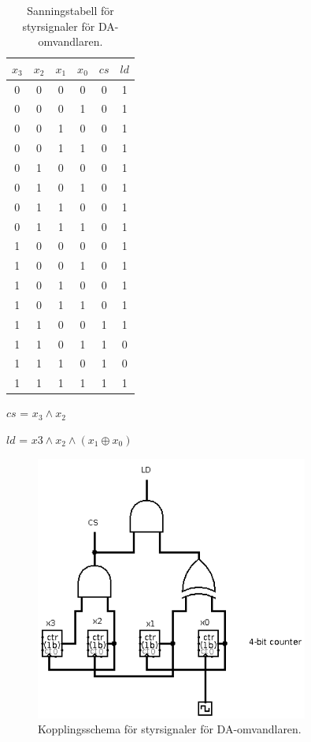 \documentclass[a4paper,10pt]{article}
\begin{document}
\begin{table}
\centering
\begin{tabular}{|c c c c || c c |}
\hline
$x_3$ & $x_2$ & $x_1$ & $x_0$ & $cs$ & $ld$ \\\hline
0 & 0 & 0 & 0 & 0 & 1 \\
0 & 0 & 0 & 1 & 0 & 1 \\
0 & 0 & 1 & 0 & 0 & 1 \\
0 & 0 & 1 & 1 & 0 & 1 \\
0 & 1 & 0 & 0 & 0 & 1 \\
0 & 1 & 0 & 1 & 0 & 1 \\
0 & 1 & 1 & 0 & 0 & 1 \\
0 & 1 & 1 & 1 & 0 & 1 \\
1 & 0 & 0 & 0 & 0 & 1 \\
1 & 0 & 0 & 1 & 0 & 1 \\
1 & 0 & 1 & 0 & 0 & 1 \\
1 & 0 & 1 & 1 & 0 & 1 \\
1 & 1 & 0 & 0 & 1 & 1 \\
1 & 1 & 0 & 1 & 1 & 0 \\
1 & 1 & 1 & 0 & 1 & 0 \\
1 & 1 & 1 & 1 & 1 & 1 \\
\hline
\end{tabular}

$cs$ = $x_3 \wedge x_2$

$ld$ = $x3 \wedge x_2 \wedge (x_1 \oplus x_0)$

\caption{Sanningstabell för styrsignaler för DA-omvandlaren.}
\label{tab:dac}
\end{table}

\begin{figure}
\centering
\includegraphics[width=0.8\textwidth]{daccircuit.png}
\caption{Kopplingsschema för styrsignaler för DA-omvandlaren.}
\label{fig:daccircuit}
\end{figure}
\end{document}
